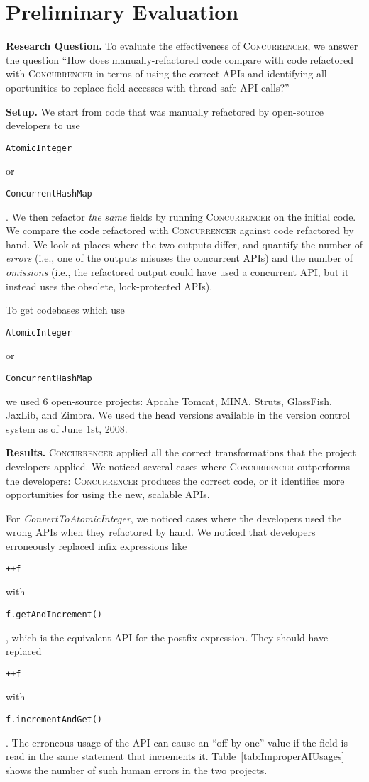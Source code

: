\documentclass[10pt,preprint]{sigplanconf}
\newcommand\tool{{\smaller\textsc{Concurrencer}}\xspace}
\newcommand{\Comment}[1]{}
\newcommand{\code}[1]{\begin{small}\texttt{#1}\end{small}}
\newcommand{\myParagraph}[1]{\textbf{#1}}
\begin{document}
\section{Preliminary Evaluation}

\myParagraph{Research Question.} To evaluate the effectiveness of \tool, we
answer the question ``How does manually-refactored code compare with code
refactored with \tool in terms of using the correct APIs and identifying all
oportunities to replace field accesses with thread-safe API calls?''

\myParagraph{Setup.} We start from code that was manually refactored by
open-source developers to use \code{AtomicInteger} or
\code{ConcurrentHashMap}. We then refactor \emph{the same} fields by
running \tool on the initial code. We compare the code refactored with \tool
against code refactored by hand. We look at places where the two outputs
differ, and quantify the number of \emph{errors} (i.e., one of the outputs
misuses the concurrent APIs) and the number of \emph{omissions} (i.e., the
refactored output could have used a concurrent API, but it instead uses the
obsolete, lock-protected APIs).

To get codebases which use \code{AtomicInteger} or \\
\code{ConcurrentHashMap} we
used 6 open-source projects: Apcahe Tomcat, MINA, Struts, GlassFish,
JaxLib, and Zimbra. We used the head versions available in the version control
system as of June 1st, 2008. 

\Comment{
Although for \code{AtomicInteger} we were able to
find both the version with the \code{int} field and the version with \code{AtomicInteger} field, for the second refactoring
(\code{ConvertToConcurrentHashMap}) we were not able to find the versions which 
contained \code{HashMap}. It seems that those projects were using
\code{ConcurrentHashMap} from the first version of the file. In those cases we
manually replaced \emph{only} the type declaration of the
\code{ConcurrentHashMap} field with \code{HashMap}; then we ran \tool to convert
the usage of \code{HashMap} back to \code{ConcurrentHashMap}
}

\myParagraph{Results.}
\tool applied all the correct transformations that the project developers
applied. We noticed several cases where \tool outperforms the developers: \tool
produces the correct code, or it identifies more opportunities for using the
new, scalable APIs.


For \emph{ConvertToAtomicInteger}, we noticed cases where
the developers used the wrong APIs when they refactored by hand. We noticed
that developers erroneously replaced infix expressions like \code{++f} with
\code{f.getAndIncrement()}, which is the equivalent API for the postfix expression. They should
have replaced \code{++f} with \code{f.incrementAndGet()}. The erroneous usage
of the API can cause an ``off-by-one'' value if the field is read in the same
statement that increments it. Table~\ref{tab:ImproperAIUsages} shows the number
of such human errors in the two projects.
\end{document}
